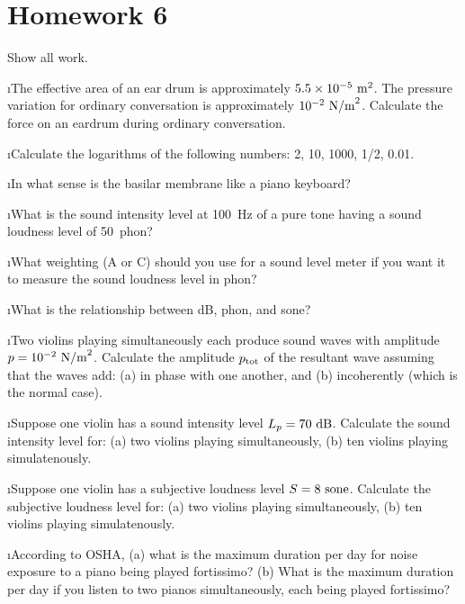 \section{Homework 6}

\noindent
Show all work.

\ben

\i The effective area of an ear drum is 
approximately $5.5\times 10^{-5}~{\rm m}^2$.
The pressure variation for ordinary 
conversation is approximately $10^{-2}~{\rm N/m}^2$.
Calculate the force on an eardrum during ordinary
conversation.

\i Calculate the logarithms of the 
following numbers: 2, 10, 1000, 1/2, 0.01.

\i In what sense is the basilar membrane
like a piano keyboard?

\i What is the sound intensity level 
at 100~Hz of a pure tone having a sound loudness
level of 50~phon?

\i What weighting (A or C) should you use 
for a sound level meter if you want it to
measure the sound loudness level in phon?

\i What is the relationship between dB,
phon, and sone?

\i Two violins playing simultaneously 
each produce sound waves with
amplitude $p=10^{-2}~{\rm N/m}^2$.
Calculate the amplitude $p_{\rm tot}$ 
of the resultant wave assuming that the waves add:
(a) in phase with one another, and
(b) incoherently (which is the normal case).

\i Suppose one violin has a sound intensity 
level $L_p=70~{\rm dB}$.
Calculate the sound intensity level for:
(a) two violins playing simultaneously,
(b) ten violins playing simulatenously.

\i Suppose one violin has a subjective loudness
level $S=8~{\rm sone}$.
Calculate the subjective loudness level for:
(a) two violins playing simultaneously,
(b) ten violins playing simulatenously.

\i According to OSHA, 
(a) what is the maximum
duration per day for noise exposure to a 
piano being played fortissimo?
(b) What is the maximum duration per day
if you listen to two pianos simultaneously, each being 
played fortissimo?

\een

